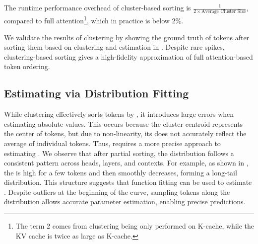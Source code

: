 The runtime performance overhead of cluster-based sorting is $\frac{1}{2 \times \text{Average Cluster Size}}$,   compared to full attention\footnote{The term 2 comes from clustering being only performed on K-cache, while the KV cache is twice as large as K-cache.}, which in practice is below $2\%$. 


We validate the results of clustering by showing the ground truth \as{} of tokens after sorting them based on clustering and estimation in . Despite rare spikes, clustering-based sorting gives a high-fidelity approximation of full attention-based token ordering.
\subsection{Estimating \AS{} via Distribution Fitting}
\label{subsec:analysis-curve-fitting}



While clustering effectively sorts tokens by \as{}, it introduces large errors when estimating absolute \as{} values. This occurs because the cluster centroid represents the center of tokens, but due to non-linearity, its \as{} does not accurately reflect the average \as{} of individual tokens. Thus, \sys requires a more precise approach to estimating \as{}. We observe that after partial sorting, the \as{} distribution follows a consistent pattern across heads, layers, and contexts. For example, as shown in , the \as{} is high for a few tokens and then smoothly decreases, forming a long-tail distribution. This structure suggests that function fitting can be used to estimate \as{}. Despite outliers at the beginning of the curve, sampling tokens along the distribution allows accurate parameter estimation, enabling precise \as{} predictions.  




